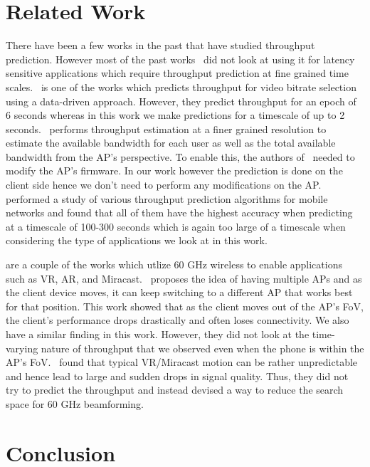 \documentclass[sigconf,anonymous]{acmart}
\begin{document}
\section{Related Work} %

There have been a few works in the past that have studied throughput prediction. However most of the past works~\cite{mirza:sigmetrics2007, bui:ewc2014, liu:globecom2015} did not look at using it for latency sensitive applications which require throughput prediction at fine grained time scales.~\cite{sun:sigcomm2016} is one of the works which predicts throughput for video bitrate selection using a data-driven approach. However, they predict throughput for an epoch of 6 seconds whereas in this work we make predictions for a timescale of up to 2 seconds.~\cite{liu:atc2020} performs throughput estimation at a finer grained resolution to estimate the available bandwidth for each user as well as the total available bandwidth from the AP's perspective. To enable this, the authors of~\cite{liu:atc2020} needed to modify the AP's firmware. In our work however the prediction is done on the client side hence we don't need to perform any modifications on the AP.~\cite{liu:globecom2015} performed a study of various throughput prediction algorithms for mobile networks and found that all of them have the highest accuracy when predicting at a timescale of 100-300 seconds which is again too large of a timescale when considering the type of applications we look at in this work.

\cite{wei:mobicom2017,zhou:infocom2018} are a couple of the works which utlize 60 GHz wireless to enable applications such as VR, AR, and Miracast.~\cite{wei:mobicom2017} proposes the idea of having multiple APs and as the client device moves, it can keep switching to a different AP that works best for that position. This work showed that as the client moves out of the AP's FoV, the client's performance drops drastically and often loses connectivity. We also have a similar finding in this work. However, they did not look at the time-varying nature of throughput that we observed even when the phone is within the AP's FoV.~\cite{zhou:infocom2018} found that typical VR/Miracast motion can be rather unpredictable and hence lead to large and sudden drops in signal quality. Thus, they did not try to predict the throughput and instead devised a way to reduce the search space for 60 GHz beamforming.

\section{Conclusion}
\end{document}
